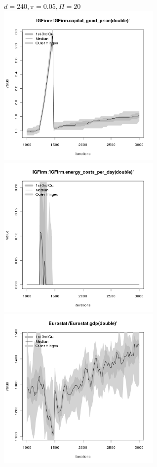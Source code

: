 \begin{figure}[ht!]
\centering\leavevmode
\begin{minipage}{17cm}
\centering\leavevmode
{$d=240, \pi=0.05, \Pi=20$}\\
\includegraphics[width=8cm]{./energy_shock/png/duration_240/intensity_0.05/frequency_20/IGFirm-capital_good_price.png}
\includegraphics[width=8cm]{./energy_shock/png/duration_240/intensity_0.05/frequency_20/IGFirm-energy_costs_per_day.png}
\includegraphics[width=8cm]{./energy_shock/png/duration_240/intensity_0.05/frequency_20/Eurostat-gdp.png}

\end{minipage}
\end{figure}
